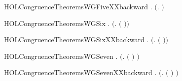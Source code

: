 \newcommand{\HOLCongruenceTheoremsWGFive}{\UseVerbatim{HOLCongruenceTheoremsWGFive}}
\begin{SaveVerbatim}{HOLCongruenceTheoremsWGFiveXXbackward}
\HOLTokenTurnstile{} \HOLSymConst{\HOLTokenForall{}} .  \ensuremath{(}\HOLTokenLambda{}.   \HOLSymConst{\ensuremath{\mid}}  \ensuremath{)} \HOLSymConst{\HOLTokenImp{}}   \HOLSymConst{\HOLTokenConj{}}  
\end{SaveVerbatim}
\newcommand{\HOLCongruenceTheoremsWGFiveXXbackward}{\UseVerbatim{HOLCongruenceTheoremsWGFiveXXbackward}}
\begin{SaveVerbatim}{HOLCongruenceTheoremsWGSix}
\HOLTokenTurnstile{} \HOLSymConst{\HOLTokenForall{}} .   \HOLSymConst{\HOLTokenImp{}}  \ensuremath{(}\HOLTokenLambda{}.   \ensuremath{(} \ensuremath{)}\ensuremath{)}
\end{SaveVerbatim}
\newcommand{\HOLCongruenceTheoremsWGSix}{\UseVerbatim{HOLCongruenceTheoremsWGSix}}
\begin{SaveVerbatim}{HOLCongruenceTheoremsWGSixXXbackward}
\HOLTokenTurnstile{} \HOLSymConst{\HOLTokenForall{}} .  \ensuremath{(}\HOLTokenLambda{}.   \ensuremath{(} \ensuremath{)}\ensuremath{)} \HOLSymConst{\HOLTokenImp{}}  
\end{SaveVerbatim}
\newcommand{\HOLCongruenceTheoremsWGSixXXbackward}{\UseVerbatim{HOLCongruenceTheoremsWGSixXXbackward}}
\begin{SaveVerbatim}{HOLCongruenceTheoremsWGSeven}
\HOLTokenTurnstile{} \HOLSymConst{\HOLTokenForall{}} .   \HOLSymConst{\HOLTokenImp{}}  \ensuremath{(}\HOLTokenLambda{}.  \ensuremath{(} \ensuremath{)} \ensuremath{)}
\end{SaveVerbatim}
\newcommand{\HOLCongruenceTheoremsWGSeven}{\UseVerbatim{HOLCongruenceTheoremsWGSeven}}
\begin{SaveVerbatim}{HOLCongruenceTheoremsWGSevenXXbackward}
\HOLTokenTurnstile{} \HOLSymConst{\HOLTokenForall{}} .  \ensuremath{(}\HOLTokenLambda{}.  \ensuremath{(} \ensuremath{)} \ensuremath{)} \HOLSymConst{\HOLTokenImp{}}  
\end{SaveVerbatim}
